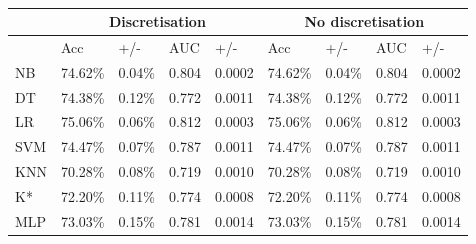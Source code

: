 \begin{table}[htbp]
\caption{}
\begin{tabular}{|l|r|r|r|r|r|r|r|r|}
\hline
 & \multicolumn{ 4}{c|}{Discretisation} & \multicolumn{ 4}{c|}{No discretisation} \\ \hline
 & \multicolumn{1}{l|}{Acc} & \multicolumn{1}{l|}{+/-} & \multicolumn{1}{l|}{AUC} & \multicolumn{1}{l|}{+/-} & \multicolumn{1}{l|}{Acc} & \multicolumn{1}{l|}{+/-} & \multicolumn{1}{l|}{AUC} & \multicolumn{1}{l|}{+/-} \\ \hline
NB & 74.62\% & 0.04\% & 0.804 & 0.0002 & 74.62\% & 0.04\% & 0.804 & 0.0002 \\ \hline
DT & 74.38\% & 0.12\% & 0.772 & 0.0011 & 74.38\% & 0.12\% & 0.772 & 0.0011 \\ \hline
LR & 75.06\% & 0.06\% & 0.812 & 0.0003 & 75.06\% & 0.06\% & 0.812 & 0.0003 \\ \hline
SVM & 74.47\% & 0.07\% & 0.787 & 0.0011 & 74.47\% & 0.07\% & 0.787 & 0.0011 \\ \hline
KNN & 70.28\% & 0.08\% & 0.719 & 0.0010 & 70.28\% & 0.08\% & 0.719 & 0.0010 \\ \hline
K* & 72.20\% & 0.11\% & 0.774 & 0.0008 & 72.20\% & 0.11\% & 0.774 & 0.0008 \\ \hline
MLP & 73.03\% & 0.15\% & 0.781 & 0.0014 & 73.03\% & 0.15\% & 0.781 & 0.0014 \\ \hline
\end{tabular}
\label{}
\end{table}

